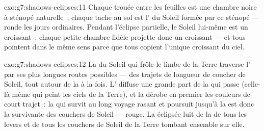 \begin{solution}{exo:g7:shadows-eclipses:11}
Chaque trouée entre les feuilles est une chambre noire à sténopé
naturelle~; chaque tache au sol est l' du Soleil formée par ce
sténopé --- ronde les jours ordinaires. Pendant l'éclipse partielle,
le Soleil lui-même est un croissant~: chaque petite chambre fidèle
projette donc un croissant --- et tous pointent dans le même sens
parce que tous copient l'unique croissant du ciel.
\end{solution}

\begin{solution}{exo:g7:shadows-eclipses:12}
La  du Soleil qui frôle le limbe de la Terre traverse
l' par ses plus longues routes possibles --- des trajets de
longueur de coucher de Soleil, tout autour de la  à la fois.
L' diffuse une grande part de la  qui passe (celle-là même
qui peint les ciels de la Terre), et la  dérobe en premier
les couleurs de court trajet~: la  qui survit au long voyage
rasant et poursuit jusqu'à la  est donc la survivante des
couchers de Soleil --- rouge. La  éclipsée luit de la  de
tous les levers et de tous les couchers de Soleil de la Terre tombant
ensemble sur elle.
\end{solution}

